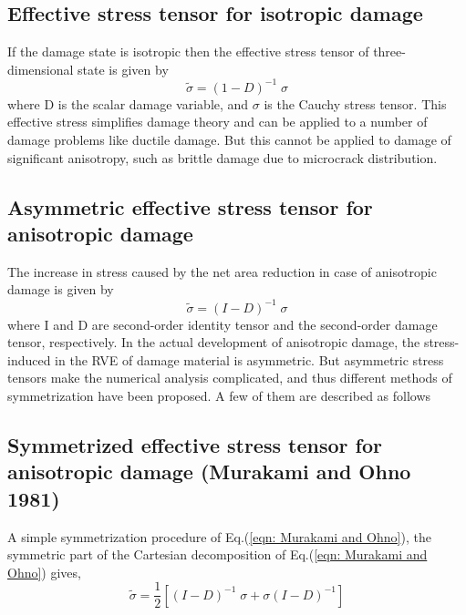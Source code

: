 \documentclass[12pt]{report}
\begin{document}
\subsection{Effective stress tensor for isotropic damage}
\indent\indent\indent If the damage state is isotropic then the effective stress tensor of three-dimensional state is given by
\begin{equation}
\tilde{\sigma} = (1 - D)^{-1} \; \sigma
\end{equation}
where D is the scalar damage variable, and $\sigma$ is the Cauchy stress tensor. This effective stress simplifies damage theory and can be applied to a number of damage problems like ductile damage. But this cannot be applied to damage of significant anisotropy, such as brittle damage due to microcrack distribution.\\
\subsection{Asymmetric effective stress tensor for anisotropic damage}
\indent\indent\indent The increase in stress caused by the net area reduction in case of anisotropic damage is given by
\begin{equation}
\tilde{\sigma} = (I - D)^{-1} \; \sigma
\end{equation}
where I and D are second-order identity tensor and the second-order damage tensor, respectively. In the actual development of anisotropic damage, the stress-induced in the RVE of damage material is asymmetric. But asymmetric stress tensors make the numerical analysis complicated, and thus different methods of symmetrization have been proposed. A few of them are described as follows

\subsection{Symmetrized effective stress tensor for anisotropic damage (Murakami and Ohno 1981)} 
\indent\indent\indent A simple symmetrization procedure of Eq.(\ref{eqn: Murakami and Ohno}), the symmetric part of the Cartesian decomposition of Eq.(\ref{eqn: Murakami and Ohno}) gives,
\begin{equation}
\label{eqn: Murakami and Ohno}
\tilde{\sigma} = \frac{1}{2} [(I - D)^{-1}\;\sigma + \sigma(I - D)^{-1}]
\end{equation}\\
\end{document}
